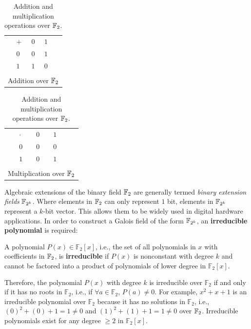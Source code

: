 \begin{table}[bp]
\caption{Addition and multiplication operations over ${\mathbb{F}}_2$.\vspace{0.5cm}}
	\centering
	\label{tab:1stTab}
	\begin{tabular}{m{1cm}|l|ll|m{1cm}}
	\hhline{~---~}
	\multirow{3}{*}{} & $+$ & $0$ & $1$ & \multirow{3}{*}{} \\
	\hhline{~---~}
	& $0$ & $0$ & $1$ & \\
	& $1$ & $1$ & $0$ & \\
	\hhline{~---~}
	\multicolumn{5}{c}{}\\
	\multicolumn{5}{c}{Addition over ${\mathbb{F}}_2$}\\
	\end{tabular}
	\quad
	\begin{tabular}{m{1cm}|l|ll|m{1cm}}
	\hhline{~---~}
	\multirow{3}{*}{} & $\cdot$ & $0$ & $1$ & \multirow{3}{*}{} \\
	\hhline{~---~}
	& $0$ & $0$ & $0$ & \\
	& $1$ & $0$ & $1$ & \\
	\hhline{~---~}
	\multicolumn{5}{c}{}\\
	\multicolumn{5}{c}{Multiplication over ${\mathbb{F}}_2$}\\
	\end{tabular}
	
	
\end{table}

Algebraic extensions of the binary field ${\mathbb{F}}_{2}$  
are generally termed {\it binary extension fields} ${\mathbb{F}}_{2^k}$.
Where elements in ${\mathbb{F}}_2$ can only represent $1$ bit, elements in ${\mathbb{F}}_{2^k}$ 
represent a $k$-bit vector.
This allows them to be widely used in digital hardware applications.
In order to construct a Galois field of the form ${\mathbb{F}}_{2^k}$, 
an {\bf irreducible polynomial} is required:
\begin{Definition}
A polynomial $P(x) \in \mathbb{F}_{2}\left[x\right]$, i.e., the set of all 
polynomials in $x$ with coefficients in ${\mathbb{F}}_2$, is {\bf irreducible} 
if $P(x)$ is nonconstant with degree $k$ and cannot be 
factored into a product of polynomials of lower degree in $\mathbb{F}_2[x]$.
\end{Definition}

Therefore, the polynomial $P(x)$ with degree $k$ is irreducible over 
$\mathbb{F}_{2}$ if and only if it has no roots in $\mathbb{F}_{2}$,
i.e., if $\forall a \in \mathbb{F}_{2}$, $P(a)\neq 0$.
For example, $x^2+x+1$ is an irreducible polynomial over $\mathbb{F}_{2}$
because it has no solutions in $\mathbb{F}_{2}$, i.e., $(0)^2+(0)+1=1\neq0$ 
and $(1)^2+(1)+1=1\neq0$ over ${\mathbb{F}}_2$.
Irreducible polynomials exist for any degree $\geq 2$ in $\mathbb{F}_2[x]$.

